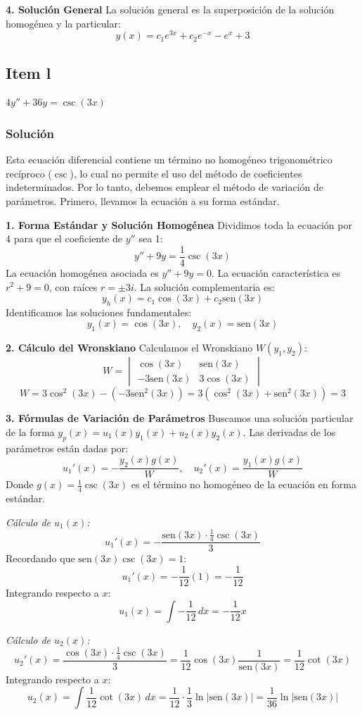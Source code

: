 \documentclass[a4paper]{article}
\begin{document}
\textbf{4. Solución General}
La solución general es la superposición de la solución homogénea y la particular:
$$
y(x) = c_1 e^{3x} + c_2 e^{-x} - e^x + 3
$$

\subsection{Item l}
$4y'' + 36y = \csc(3x)$

\subsubsection{Solución}
Esta ecuación diferencial contiene un término no homogéneo trigonométrico recíproco ($\csc$), lo cual no permite el uso del método de coeficientes indeterminados. Por lo tanto, debemos emplear el método de variación de parámetros. Primero, llevamos la ecuación a su forma estándar.

\textbf{1. Forma Estándar y Solución Homogénea}
Dividimos toda la ecuación por 4 para que el coeficiente de $y''$ sea 1:
$$
y'' + 9y = \frac{1}{4} \csc(3x)
$$
La ecuación homogénea asociada es $y'' + 9y = 0$. La ecuación característica es $r^2 + 9 = 0$, con raíces $r = \pm 3i$. La solución complementaria es:
$$
y_h(x) = c_1 \cos(3x) + c_2 \text{sen}(3x)
$$
Identificamos las soluciones fundamentales:
$$
y_1(x) = \cos(3x), \quad y_2(x) = \text{sen}(3x)
$$

\textbf{2. Cálculo del Wronskiano}
Calculamos el Wronskiano $W(y_1, y_2)$:
$$
W = \begin{vmatrix} \cos(3x) & \text{sen}(3x) \\ -3\text{sen}(3x) & 3\cos(3x) \end{vmatrix}
$$
$$
W = 3\cos^2(3x) - (-3\text{sen}^2(3x)) = 3(\cos^2(3x) + \text{sen}^2(3x)) = 3
$$

\textbf{3. Fórmulas de Variación de Parámetros}
Buscamos una solución particular de la forma $y_p(x) = u_1(x)y_1(x) + u_2(x)y_2(x)$. Las derivadas de los parámetros están dadas por:
$$
u_1'(x) = -\frac{y_2(x) g(x)}{W}, \quad u_2'(x) = \frac{y_1(x) g(x)}{W}
$$
Donde $g(x) = \frac{1}{4} \csc(3x)$ es el término no homogéneo de la ecuación en forma estándar.

\textit{Cálculo de $u_1(x)$:}
$$
u_1'(x) = -\frac{\text{sen}(3x) \cdot \frac{1}{4} \csc(3x)}{3}
$$
Recordando que $\text{sen}(3x) \csc(3x) = 1$:
$$
u_1'(x) = -\frac{1}{12} (1) = -\frac{1}{12}
$$
Integrando respecto a $x$:
$$
u_1(x) = \int -\frac{1}{12} \, dx = -\frac{1}{12} x
$$

\textit{Cálculo de $u_2(x)$:}
$$
u_2'(x) = \frac{\cos(3x) \cdot \frac{1}{4} \csc(3x)}{3} = \frac{1}{12} \cos(3x) \frac{1}{\text{sen}(3x)} = \frac{1}{12} \cot(3x)
$$
Integrando respecto a $x$:
$$
u_2(x) = \int \frac{1}{12} \cot(3x) \, dx = \frac{1}{12} \cdot \frac{1}{3} \ln|\text{sen}(3x)| = \frac{1}{36} \ln|\text{sen}(3x)|
$$
\end{document}
